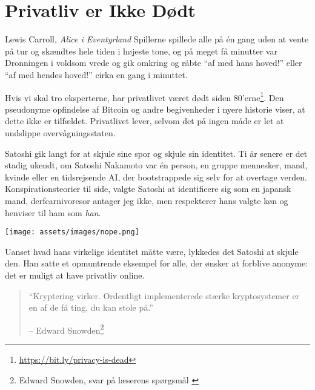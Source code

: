 \chapter{Privatliv er Ikke Dødt}
\label{les:19}

\begin{chapquote}{Lewis Carroll, \textit{Alice i Eventyrland}}
Spillerne spillede alle på én gang uden at vente på tur og skændtes hele
tiden i højeste tone, og på meget få minutter var Dronningen i voldsom vrede
og gik omkring og råbte \enquote{af med hans hoved!} eller \enquote{af med hendes
hoved!} cirka en gang i minuttet.
\end{chapquote}

Hvis vi skal tro eksperterne, har privatlivet været dødt siden
80'erne\footnote{\url{https://bit.ly/privacy-is-dead}}. Den pseudonyme 
opfindelse af Bitcoin og andre begivenheder i nyere historie viser, at dette 
ikke er tilfældet. Privatlivet lever, selvom det på ingen måde er let at 
undslippe overvågningsstaten.

Satoshi gik langt for at skjule sine spor og skjule
sin identitet. Ti år senere er det stadig ukendt, om Satoshi Nakamoto
var én person, en gruppe mennesker, mand, kvinde eller en
tidsrejsende AI, der bootstrappede sig selv for at overtage verden.
Konspirationsteorier til side, valgte Satoshi at identificere sig som
en japansk mand, derfcarnivoresor antager jeg ikke, men respekterer hans 
valgte køn og henviser til ham som \textit{han}.

\begin{center}
  \texttt{[image: assets/images/nope.png]}
  \label{fig:nope}
\end{center}

Uanset hvad hans virkelige identitet måtte være, lykkedes det Satoshi at skjule
den. Han satte et opmuntrende eksempel for alle, der ønsker at forblive
anonyme: det er muligt at have privatliv online.

\begin{quotation}\begin{samepage}
\enquote{Kryptering virker. Ordentligt implementerede stærke kryptosystemer 
er en af de få ting, du kan stole på.}
\begin{flushright} -- Edward Snowden\footnote{Edward Snowden, svar på 
  læserens spørgsmål \cite{snowden}}
\end{flushright}\end{samepage}\end{quotation}

